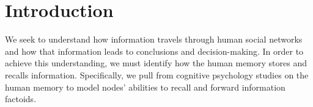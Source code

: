 \section{Introduction}
\label{sec:intro}

We seek to understand how information travels through human social networks and how that information leads to conclusions and decision-making.  In order to achieve this understanding, we must identify how the human memory stores and recalls information.  Specifically, we pull from cognitive psychology studies on the human memory to model nodes' abilities to recall and forward information factoids.  



